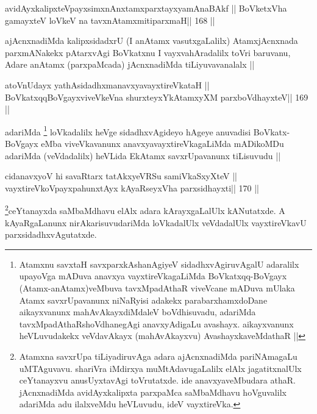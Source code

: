 \begin{shl}
avidAyxkalipxteV\s payxsimxnAnxtamxparxtayxyamAnaBAkf ||
BoVketxVha gamayxteV loVkeV na tavxnAtamxmitiparxmaH\hfill || 168 ||
\end{shl}

\begin{artha}
ajAcnxnadiMda kalipxsidadxrU (I anAtamx vasutxgaLalilx) AtamxjAcnxnada 
parxmANakekx pAtarxvAgi BoVkatxnu I vayxvahAradalilx toVri baruvanu, Adare anAtamx (parxpaMcada) jAcnxnadiMda tiLiyuvavanalalx ||
\end{artha}

\begin{shl}
atoV\s nUdayx yathAsidadhxmanavxyavayxtireVkataH ||
BoVkatxqqBoVgayxviveVkeVna shurxteyxYkAtamxyXM parxboVdhayxteV\hfill || 169 ||
\end{shl}

\begin{artha}
adariMda \footnote[10]{Atamxnu savxtaH savxparxkAshanAgiyeV 
sidadhxvAgiruvAgalU adaralilx upayoVga mADuva anavxya vayxtireVkagaLiMda BoVkatxqq-BoVgayx (Atamx-anAtamx)veMbuva tavxMpadAthaR viveVcane mADuva mUlaka Atamx savxrUpavanunx niNaRyisi adakekx parabarxhamxdoDane aikayxvanunx mahAvAkayxdiMdaleV boVdhisuvadu, adariMda tavxMpadAthaRshoVdhanegAgi anavxyAdigaLu avashayx. aikayxvanunx heVLuvudakekx veVdavAkayx (mahAvAkayxvu) AvashayxkaveMdathaR ||} loVkadalilx heVge sidadhxvAgideyo hAgeye anuvadisi BoVkatx-BoVgayx eMba viveVkavanunx anavxyavayxtireVkagaLiMda mADikoMDu adariMda (veVdadalilx) heVLida EkAtamx savxrUpavanunx tiLisuvudu ||
\end{artha}


\begin{shl}
cidanavxyoV hi savaRtarx tatAkxyeVRSu samiVkaSxyXteV ||
vayxtireVkoV\s payxpahunxtAyx kAyaRseyxVha parxsidhayxti\hfill || 170 ||
\end{shl}

\begin{artha}
\footnote[11]{Atamxna savxrUpa tiLiyadiruvAga adara ajAcnxnadiMda 
pariNAmagaLu uMTAguvavu. shariVra iMdirxya muMtAdavugaLalilx elAlx 
jagatitxnalUlx ceYtanayxvu anusUyxtavAgi toVrutatxde. ide 
anavxyaveMbudara athaR. jAcnxnadiMda avidAyxkalipxta parxpaMca 
saMbaMdhavu hoVguvalilx adariMda adu ilalxveMdu heVLuvudu, ideV vayxtireVka.}ceYtanayxda saMbaMdhavu elAlx adara kArayxgaLalUlx kANutatxde. A kAyaRgaLanunx nirAkarisuvudariMda loVkadalUlx veVdadalUlx vayxtireVkavU parxsidadhxvAgutatxde.
\end{artha}

